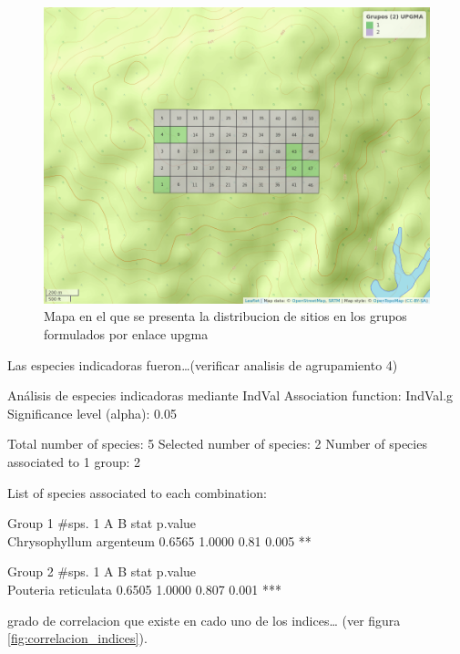 \documentclass[11pt,]{article}
\begin{document}
\begin{figure}
\centering
\includegraphics{mapa_upgma_k2.png}
\caption{Mapa en el que se presenta la distribucion de sitios en los
grupos formulados por enlace upgma\label{fig:mapa_upgma_k2}}
\end{figure}

Las especies indicadoras fueron\ldots{}(verificar analisis de
agrupamiento 4)

Análisis de especies indicadoras mediante IndVal Association function:
IndVal.g Significance level (alpha): 0.05

Total number of species: 5 Selected number of species: 2 Number of
species associated to 1 group: 2

List of species associated to each combination:

Group 1 \#sps. 1 A B stat p.value\\
Chrysophyllum argenteum 0.6565 1.0000 0.81 0.005 **

Group 2 \#sps. 1 A B stat p.value\\
Pouteria reticulata 0.6505 1.0000 0.807 0.001 ***

grado de correlacion que existe en cado uno de los indices\ldots{} (ver
figura \ref{fig:correlacion_indices}).
\end{document}
